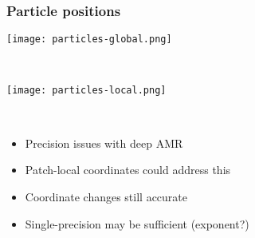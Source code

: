 \begin{frame}[fragile] \frametitle{Particle positions}
\vspace{-0.2in}
\begin{minipage}{1.8in}
\texttt{[image: particles-global.png]}
\end{minipage} \
\begin{minipage}{2.0in}
\texttt{[image: particles-local.png]}
\end{minipage} \
      \begin{itemize}
        \item Precision issues with deep AMR
        \enhance{2}\item Patch-local coordinates could address this
        \enhance{3}\item Coordinate changes still accurate
        \enhance{4}\item Single-precision may be sufficient (exponent?)
      \end{itemize}
\end{frame}
